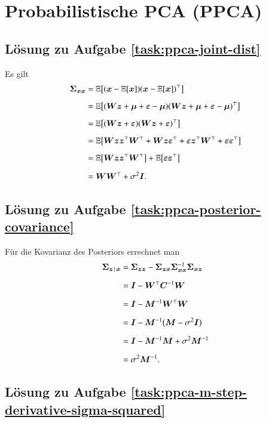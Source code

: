 \section{Probabilistische PCA (PPCA)}

\subsection*{Lösung zu Aufgabe \ref{task:ppca-joint-dist}}

Es gilt
\begin{align*}
	\bm{\Sigma}_{\bm{x}\bm{x}}
		&= \mathbb{E}\bigl[ (\bm{x} - \mathbb{E}[\bm{x}]) (\bm{x} - \mathbb{E}[\bm{x}])^\top \bigr]
\\[2mm]
		&= \mathbb{E}\bigl[ (\bm{W} \bm{z} + \bm{\mu} + \bm{\varepsilon} - \bm{\mu}) (\bm{W} \bm{z} + \bm{\mu} + \bm{\varepsilon} - \bm{\mu})^\top \bigr]
\\[2mm]
		&= \mathbb{E}\bigl[ (\bm{W} \bm{z} + \bm{\varepsilon}) (\bm{W} \bm{z} + \bm{\varepsilon})^\top \bigr]
\\[2mm]
		&= \mathbb{E}\bigl[ \bm{W} \bm{z} \bm{z}^\top \bm{W}^\top + \bm{W} \bm{z} \bm{\varepsilon}^\top + \bm{\varepsilon} \bm{z}^\top \bm{W}^\top + \bm{\varepsilon} \bm{\varepsilon}^\top \bigr]
\\[2mm]
		&= \mathbb{E}\bigl[ \bm{W} \bm{z} \bm{z}^\top \bm{W}^\top \bigr] + \mathbb{E}\bigl[ \bm{\varepsilon} \bm{\varepsilon}^\top \bigr]
\\[2mm]
		&= \bm{W} \bm{W}^\top + \sigma^2 \bm{I}.
\end{align*}


\subsection*{Lösung zu Aufgabe \ref{task:ppca-posterior-covariance}}

Für die Kovarianz des Posteriors errechnet man
\begin{align*}
	\bm{\Sigma}_{\bm{z}\,\mid\,\bm{x}}
		&= \bm{\Sigma}_{\bm{z}\bm{z}} - \bm{\Sigma}_{\bm{z}\bm{x}} \bm{\Sigma}_{\bm{x}\bm{x}}^{-1} \bm{\Sigma}_{\bm{x}\bm{z}}
\\[2mm]
		&= \bm{I} - \bm{W}^\top \bm{C}^{-1} \bm{W}
\\[2mm]
		&= \bm{I} - \bm{M}^{-1} \bm{W}^\top \bm{W}
\\[2mm]
		&= \bm{I} - \bm{M}^{-1} \bigl( \bm{M} - \sigma^2 \bm{I} \bigr)
\\[2mm]
		&= \bm{I} - \bm{M}^{-1} \bm{M} + \sigma^2 \bm{M}^{-1}
\\[2mm]
		&= \sigma^2 \bm{M}^{-1}.
\end{align*}


\subsection*{Lösung zu Aufgabe \ref{task:ppca-m-step-derivative-sigma-squared}}

